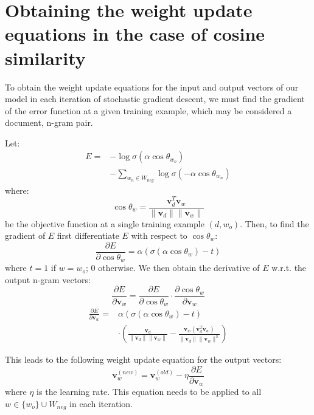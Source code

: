 \documentclass[11pt,a4paper]{article}
\begin{document}



\appendix

\section{Obtaining the weight update equations in the case of cosine similarity}

To obtain the weight update equations for the input and output vectors of our model in each iteration of stochastic gradient descent, we must find the gradient of the error function at a given training example, which may be considered a document, n-gram pair. 

Let: 
\begin{align}
E =  &- \log \sigma \left( \alpha \cos \theta_{w_o} \right) \nonumber \\
&- \sum_{w_n \in W_{neg}} \log \sigma \left( - \alpha \cos \theta_{w_n} \right)  
\end{align}
where:
\begin{equation}
\cos \theta_w = \frac {\mathbold{v}_d^T \mathbold{v}_w} {\lVert \mathbold{v}_d \rVert \lVert \mathbold{v}_w \rVert}
\end{equation}
be the objective function at a single training example $(d,w_o)$. Then, to find the gradient of $E$ first differentiate $E$ with respect to $\cos \theta_w$: 
\begin{equation}
\frac {\partial E} {\partial \cos \theta_w} = \alpha \left( \sigma \left( \alpha \cos \theta_w \right) - t \right)
\end{equation}
where $t = 1$ if $w = w_o$; $0$ otherwise. We then obtain the derivative of $E$ w.r.t. the output n-gram vectors: 
\begin{equation}
\frac {\partial E} {\partial \mathbold{v}_w} = \frac {\partial E} {\partial \cos \theta_w} \cdot \frac {\partial \cos \theta_w} {\partial \mathbold{v}_w} 
\end{equation}
\begin{align}
\frac {\partial E} {\partial \mathbold{v}_w} = {}&\alpha \left( \sigma \left( \alpha \cos \theta_w \right) - t \right) \nonumber \\
&\cdot\left( \frac {\mathbold{v}_d} {\lVert \mathbold{v}_d \rVert \lVert \mathbold{v}_w \rVert} - \frac { \mathbold{v}_w\left(\mathbold{v}_d^T \mathbold{v}_w\right)} {\lVert \mathbold{v}_d \rVert \lVert \mathbold{v}_w \rVert^3} \right)
\end{align}

This leads to the following weight update equation for the output vectors: 
\begin{equation}
\mathbold{v}_w^{(new)} = \mathbold{v}_w^{(old)} - \eta \frac {\partial E} {\partial \mathbold{v}_w}
\end{equation}
where $\eta$ is the learning rate. This equation needs to be applied to all $w \in \{w_o\} \cup W_{neg}$ in each iteration.
\end{document}
